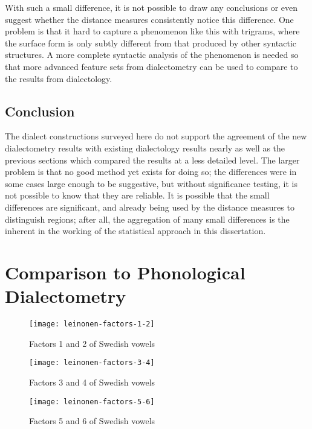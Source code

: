 With such a small difference, it is not possible to draw any
conclusions or even suggest whether the distance measures consistently
notice this difference. One problem is that it hard to capture a
phenomenon like this with trigrams, where the surface form is only
subtly different from that produced by other syntactic structures. A
more complete syntactic analysis of the phenomenon is needed so that
more advanced feature sets from dialectometry can be used to compare
to the results from dialectology.

\subsection{Conclusion}

The dialect constructions surveyed here do not support the agreement
of the new dialectometry results with existing dialectology results
nearly as well as the previous sections which compared the results at
a less detailed level. The larger problem is that no good method yet
exists for doing so; the differences were in some cases large enough
to be suggestive, but without significance testing, it is not possible
to know that they are reliable. It is possible that the small
differences are significant, and already being used by the distance
measures to distinguish regions; after all, the aggregation of many
small differences is the inherent in the working of the statistical
approach in this dissertation.

\section{Comparison to Phonological Dialectometry}

\begin{figure}
  \texttt{[image: leinonen-factors-1-2]}
  \caption{Factors 1 and 2 of Swedish vowels}
  \label{leinonen-factors-1-2}
\end{figure}

\begin{figure}
  \texttt{[image: leinonen-factors-3-4]}
  \caption{Factors 3 and 4 of Swedish vowels}
  \label{leinonen-factors-3-4}
\end{figure}

\begin{figure}
  \texttt{[image: leinonen-factors-5-6]}
  \caption{Factors 5 and 6 of Swedish vowels}
  \label{leinonen-factors-5-6}
\end{figure}

